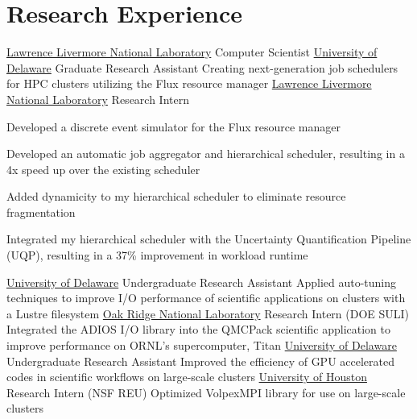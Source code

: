 \section{Research Experience}
		{\href{https://www.llnl.gov}{Lawrence Livermore National Laboratory}}
		{Computer Scientist}
		{}{}
		{}
		{\href{https://www.udel.edu}{University of Delaware}}
		{Graduate Research Assistant}
		{}{}
		{Creating next-generation job schedulers for HPC clusters utilizing the Flux resource manager}
		{\href{https://www.llnl.gov}{Lawrence Livermore National Laboratory}}
		{Research Intern}
		{}{}
		{
          \begin{description}[labelwidth=0.8cm,leftmargin=!]
          \item[2014:] Developed a discrete event simulator for the Flux resource manager
          \item[2015:] Developed an automatic job aggregator and hierarchical scheduler, resulting in a 4x speed up over the existing scheduler
          \item[2016:] Added dynamicity to my hierarchical scheduler to eliminate resource fragmentation
          \item[2017:] Integrated my hierarchical scheduler with the Uncertainty Quantification Pipeline (UQP), resulting in a 37\% improvement in workload runtime \label{last-item}
          \end{description}
        }
		{\href{http://www.udel.edu}{University of Delaware}}
		{Undergraduate Research Assistant}
		{}{}
		{Applied auto-tuning techniques to improve I/O performance of scientific applications on clusters with a Lustre filesystem}
		{\href{https://www.ornl.gov}{Oak Ridge National Laboratory}}
		{Research Intern (DOE SULI)}
		{}{}
		{Integrated the ADIOS I/O library into the QMCPack scientific application to improve performance on ORNL’s supercomputer, Titan}
		{\href{http://www.udel.edu}{University of Delaware}}
		{Undergraduate Research Assistant}
		{}{}
		{Improved the efficiency of GPU accelerated codes in scientific workflows on large-scale clusters}
		{\href{http://uh.edu}{University of Houston}}
		{Research Intern (NSF REU)}
		{}{}
		{Optimized VolpexMPI library for use on large-scale clusters}

